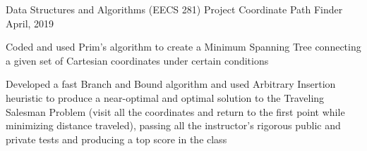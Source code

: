 \begin{cventries}
  \cventry
    {Data Structures and Algorithms (EECS 281) Project}
    {Coordinate Path Finder}
    {April, 2019}
    {}
    {
      \begin{cvitems} %
        \item {Coded and used Prim's algorithm to create a Minimum Spanning Tree connecting a given set of Cartesian coordinates under certain conditions}
        \item {Developed a fast Branch and Bound algorithm and used Arbitrary Insertion heuristic to produce a near-optimal and optimal solution
        to the Traveling Salesman Problem (visit all the coordinates and return to the first point while minimizing distance traveled),
        passing all the instructor's rigorous public and private tests and producing a top score in the class}
      \end{cvitems}
    }
\end{cventries}
